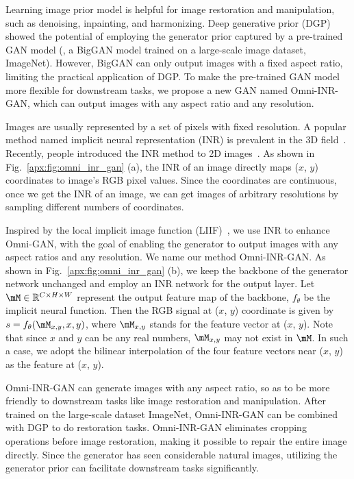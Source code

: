 \documentclass[paper_2425.tex]{subfiles}
\begin{document}
Learning image prior model is helpful for image restoration and manipulation, such as denoising, inpainting, and harmonizing. Deep generative prior (DGP)~\cite{pan2020Exploiting} showed the potential of employing the generator prior captured by a pre-trained GAN model (\ie, a BigGAN model trained on a large-scale image dataset, ImageNet). However, BigGAN can only output images with a fixed aspect ratio, limiting the practical application of DGP. To make the pre-trained GAN model more flexible for downstream tasks, we propose a new GAN named Omni-INR-GAN, which can output images with any aspect ratio and any resolution.

Images are usually represented by a set of pixels with fixed resolution. A popular method named implicit neural representation (INR) is prevalent in the 3D field~\cite{park2019DeepSDF,mescheder2019Occupancy,chen2019Learninga}. Recently, people introduced the INR method to 2D images~\cite{chen2020Learning,skorokhodov2020Adversarial}. As shown in Fig.~\ref{apx:fig:omni_inr_gan} (a), the INR of an image directly maps ($x$, $y$) coordinates to image's RGB pixel values. Since the coordinates are continuous, once we get the INR of an image, we can get images of arbitrary resolutions by sampling different numbers of coordinates.

Inspired by the local implicit image function (LIIF)~\cite{chen2020Learning}, we use INR to enhance Omni-GAN, with the goal of enabling the generator to output images with any aspect ratios and any resolution. We name our method Omni-INR-GAN.
As shown in Fig.~\ref{apx:fig:omni_inr_gan} (b), we keep the backbone of the generator network unchanged and employ an INR network for the output layer. Let $\mM \in \mathbb{R}^{C \times H \times W}$ represent the output feature map of the backbone, $f_\theta$ be the implicit neural function. Then the RGB signal at ($x$, $y$) coordinate is given by $s=f_\theta(\mM_{x, y}, x, y)$, where $\mM_{x, y}$ stands for the feature vector at ($x$, $y$). Note that since $x$ and $y$ can be any real numbers, $\mM_{x, y}$ may not exist in $\mM$. In such a case, we adopt the bilinear interpolation of the four feature vectors near ($x$, $y$) as the feature at ($x$, $y$).

Omni-INR-GAN can generate images with any aspect ratio, so as to be more friendly to downstream tasks like image restoration and manipulation. After trained on the large-scale dataset ImageNet, Omni-INR-GAN can be combined with DGP to do restoration tasks. Omni-INR-GAN eliminates cropping operations before image restoration, making it possible to repair the entire image directly. Since the generator has seen considerable natural images, utilizing the generator prior can facilitate downstream tasks significantly.
\end{document}
